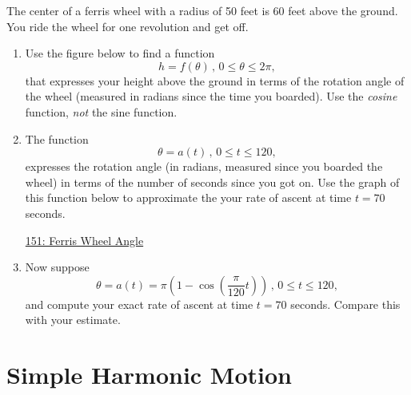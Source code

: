 \documentclass{ximera}
\begin{document}
\begin{question}  \label{Qd5t6dsfre6yuu}
The center of a ferris wheel with a radius of 50 feet is 60 feet above the ground. You ride the wheel for one revolution and get off.

\begin{enumerate}

\item Use the figure below to find a function 
\[
 h = f(\theta) \, , \, 0\leq \theta \leq 2\pi ,
\] 
that expresses your height above the ground in terms of the rotation angle of the wheel (measured in radians since the time you boarded). Use the \emph{cosine} function, \emph{not} the sine function.


\begin{onlineOnly}
    \begin{center}
\end{center}
\end{onlineOnly}


\item The function 
\[
    \theta = a(t) \, , \, 0\leq t \leq 120 ,
\]
expresses the rotation angle (in radians, measured since you boarded the wheel) in terms of the number of seconds since  you got on. Use the graph of this function below to approximate the your rate of ascent at time $t=70$ seconds. 

\begin{onlineOnly}
    \begin{center}
\end{center}
\end{onlineOnly}

\href{https://www.desmos.com/calculator/kijv21gots}{151: Ferris Wheel Angle}



\item Now suppose
\[
    \theta = a(t) = \pi \left(1- \cos \left( \frac{\pi}{120}t \right)    \right) \, , \, 0\leq t \leq 120 ,
\]
and compute your exact rate of ascent at time $t=70$ seconds. Compare this with your estimate.

\end{enumerate}
\end{question}



\section{Simple Harmonic Motion}
\end{document}
